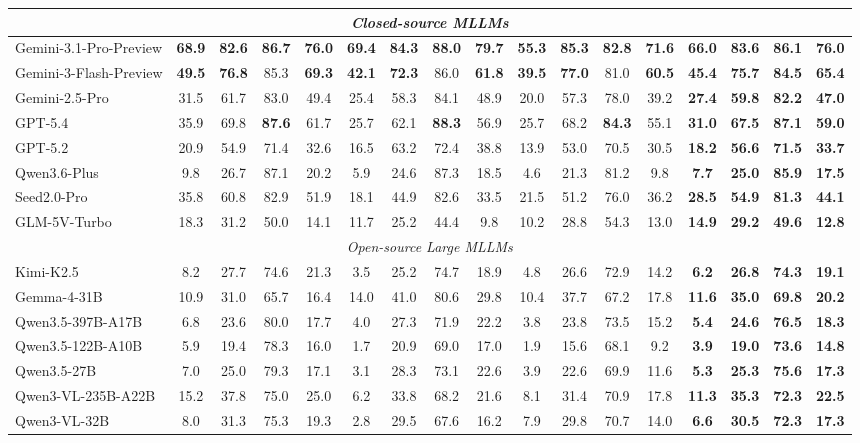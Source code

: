 \documentclass{llmxive}
\providecommand{\highlightgreen}[1]{\colorbox[HTML]{d3ff9f}{\textbf{#1}}}
\providecommand{\highlightblue}[1]{\colorbox[HTML]{bae6fb}{\textbf{#1}}}
\begin{document}
{\begin{table}[t]
\begin{tabular}{@{}l cccc cccc cccc >{\bfseries}c>{\bfseries}c>{\bfseries}c>{\bfseries}c@{}}
\multicolumn{17}{c}{\textit{Closed-source MLLMs}} \\ \midrule
Gemini-3.1-Pro-Preview&\highlightblue{68.9}&\highlightblue{82.6}&\highlightgreen{86.7}&\highlightblue{76.0}&\highlightblue{69.4}&\highlightblue{84.3}&\highlightgreen{88.0}&\highlightblue{79.7}&\highlightblue{55.3}&\highlightblue{85.3}&\highlightgreen{82.8}&\highlightblue{71.6}&\highlightblue{66.0}&\highlightblue{83.6}&\highlightgreen{86.1}&\highlightblue{76.0} \\
Gemini-3-Flash-Preview&\highlightgreen{49.5}&\highlightgreen{76.8}&85.3&\highlightgreen{69.3}&\highlightgreen{42.1}&\highlightgreen{72.3}&86.0&\highlightgreen{61.8}&\highlightgreen{39.5}&\highlightgreen{77.0}&81.0&\highlightgreen{60.5}&\highlightgreen{45.4}&\highlightgreen{75.7}&84.5&\highlightgreen{65.4} \\
Gemini-2.5-Pro&31.5&61.7&83.0&49.4&25.4&58.3&84.1&48.9&20.0&57.3&78.0&39.2&27.4&59.8&82.2&47.0\\
GPT-5.4&35.9&69.8&\highlightblue{87.6}&61.7&25.7&62.1&\highlightblue{88.3}&56.9&25.7&68.2&\highlightblue{84.3}&55.1&31.0&67.5&\highlightblue{87.1}&59.0\\
GPT-5.2 &20.9&54.9&71.4&32.6&16.5&63.2&72.4&38.8&13.9&53.0&70.5&30.5&18.2&56.6&71.5&33.7 \\
Qwen3.6-Plus&9.8&26.7&87.1&20.2&5.9&24.6&87.3&18.5&4.6&21.3&81.2&9.8&7.7&25.0&85.9&17.5\\
Seed2.0-Pro&35.8&60.8&82.9&51.9&18.1&44.9&82.6&33.5&21.5&51.2&76.0&36.2&28.5&54.9&81.3&44.1 \\
GLM-5V-Turbo &18.3&31.2&50.0&14.1&11.7&25.2&44.4&9.8&10.2&28.8&54.3&13.0&14.9&29.2&49.6&12.8\\
\midrule

\multicolumn{17}{c}{\textit{Open-source Large MLLMs}} \\ \midrule
Kimi-K2.5&8.2&27.7&74.6&21.3&3.5&25.2&74.7&18.9&4.8&26.6&72.9&14.2&6.2&26.8&74.3&19.1 \\
Gemma-4-31B &10.9&31.0&65.7&16.4&14.0&41.0&80.6&29.8&10.4&37.7&67.2&17.8&11.6&35.0&69.8&20.2\\
Qwen3.5-397B-A17B&6.8&23.6&80.0&17.7&4.0&27.3&71.9&22.2&3.8&23.8&73.5&15.2&5.4&24.6&76.5&18.3\\
Qwen3.5-122B-A10B&5.9&19.4&78.3&16.0&1.7&20.9&69.0&17.0&1.9&15.6&68.1&9.2&3.9&19.0&73.6&14.8 \\
Qwen3.5-27B &7.0&25.0&79.3&17.1&3.1&28.3&73.1&22.6&3.9&22.6&69.9&11.6&5.3&25.3&75.6&17.3\\
Qwen3-VL-235B-A22B&15.2&37.8&75.0&25.0&6.2&33.8&68.2&21.6&8.1&31.4&70.9&17.8&11.3&35.3&72.3&22.5 \\
Qwen3-VL-32B&8.0&31.3&75.3&19.3&2.8&29.5&67.6&16.2&7.9&29.8&70.7&14.0&6.6&30.5&72.3&17.3 \\
\midrule


\end{tabular}
\end{table}}
\end{document}
